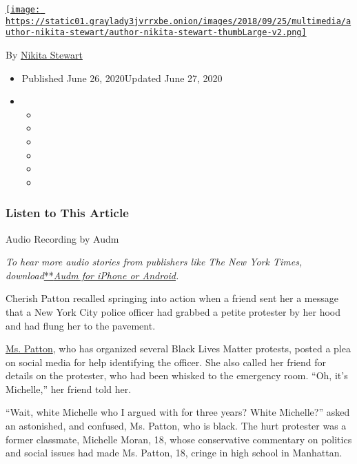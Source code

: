 \href{https://www.nytimes3xbfgragh.onion/by/nikita-stewart}{\texttt{[image: https://static01.graylady3jvrrxbe.onion/images/2018/09/25/multimedia/author-nikita-stewart/author-nikita-stewart-thumbLarge-v2.png]}}

By \href{https://www.nytimes3xbfgragh.onion/by/nikita-stewart}{Nikita
Stewart}

\begin{itemize}
\item
  Published June 26, 2020Updated June 27, 2020
\item
  \begin{itemize}
  \item
  \item
  \item
  \item
  \item
  \item
  \end{itemize}
\end{itemize}

\hypertarget{listen-to-this-article}{%
\subsubsection{Listen to This Article}\label{listen-to-this-article}}

Audio Recording by Audm

\emph{To hear more audio stories from publishers like The New York
Times,
download}\href{https://www.audm.com/?utm_source=nytmag\&utm_medium=embed\&utm_campaign=left_behind_draper}{**}\href{https://www.audm.com/?utm_source=nyt\&utm_medium=embed\&utm_campaign=black_trendy_white}{\emph{Audm
for iPhone or Android}}\emph{.}

Cherish Patton recalled springing into action when a friend sent her a
message that a New York City police officer had grabbed a petite
protester by her hood and had flung her to the pavement.

\href{https://www.instagram.com/cherishluvsyou/?hl=en}{Ms. Patton}, who
has organized several Black Lives Matter protests, posted a plea on
social media for help identifying the officer. She also called her
friend for details on the protester, who had been whisked to the
emergency room. ``Oh, it's Michelle,'' her friend told her.

``Wait, white Michelle who I argued with for three years? White
Michelle?'' asked an astonished, and confused, Ms. Patton, who is black.
The hurt protester was a former classmate, Michelle Moran, 18, whose
conservative commentary on politics and social issues had made Ms.
Patton, 18, cringe in high school in Manhattan.

